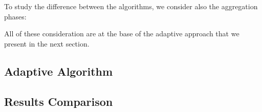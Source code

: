 To study the difference between the algorithms, we consider also the aggregation phases: 

All of these consideration are at the base of the adaptive approach that we present in the next section.	
\subsection{Adaptive Algorithm}
\subsection{Results Comparison}

